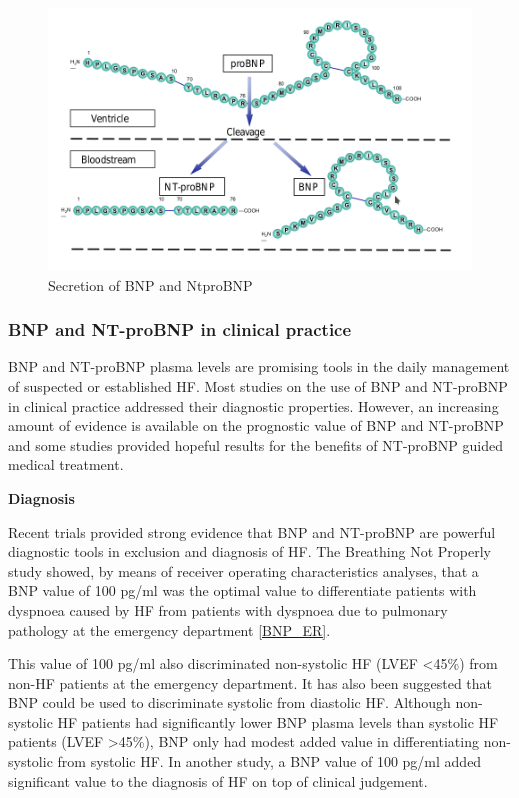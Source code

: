 \documentclass[14pt,a4paper,onecolumn]{extarticle}
\begin{document}
\begin{figure}
    \centering
    \includegraphics[scale=0.4]{./images/BNP_secretion.png}
    \caption{Secretion of BNP and NtproBNP}
    \label{BNP_secretion}
\end{figure}

\subsubsection{BNP and NT-proBNP in clinical practice}
BNP and NT-proBNP plasma levels are promising tools in the daily management of suspected or established HF. Most studies on the use of BNP and NT-proBNP in clinical practice addressed their diagnostic properties. However, an increasing amount of evidence is available on the prognostic value of BNP and NT-proBNP and some studies provided hopeful results for the benefits of NT-proBNP guided medical treatment.

\textbf{Diagnosis}

Recent trials provided strong evidence that BNP and NT-proBNP are powerful diagnostic tools in exclusion and diagnosis of HF. The Breathing Not Properly study showed, by means of receiver operating characteristics analyses, that a BNP value of 100 pg/ml was the optimal value to differentiate patients with dyspnoea caused by HF from patients with dyspnoea due to pulmonary pathology at the emergency department \ref{BNP_ER}. \citep{Maisel2002}

This value of 100 pg/ml also discriminated non-systolic HF (LVEF <45\%) from non-HF patients at the emergency department. It has also been suggested that BNP could be used to discriminate systolic from diastolic HF. Although non-systolic HF patients had significantly lower BNP plasma levels than systolic HF patients (LVEF >45\%), BNP only had modest added value in differentiating non-systolic from systolic HF. In another study, a BNP value of 100 pg/ml added significant value to the diagnosis of HF on top of clinical judgement. \citep{McCullough2002}
\end{document}
